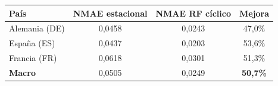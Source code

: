 \begin{tabular}{lccc}
\toprule
País & NMAE estacional & NMAE RF cíclico & Mejora \\
\midrule
Alemania (DE) & 0{,}0458 & 0{,}0243 & 47{,}0\% \\
España (ES) & 0{,}0437 & 0{,}0203 & 53{,}6\% \\
Francia (FR) & 0{,}0618 & 0{,}0301 & 51{,}3\% \\
\midrule
\textbf{Macro} & 0{,}0505 & 0{,}0249 & \textbf{50{,}7\%} \\
\bottomrule
\end{tabular}